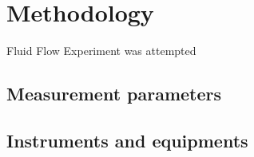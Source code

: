 
\chapter{Methodology}
Fluid Flow Experiment was attempted  
\section{Measurement parameters}
\section{Instruments and equipments}

\clearpage %
